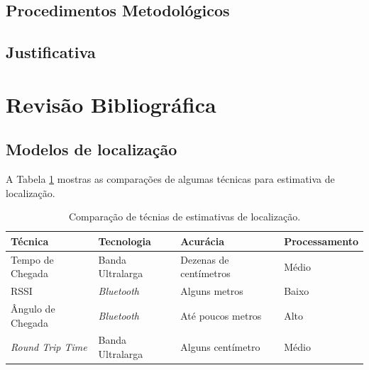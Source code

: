\documentclass[%
  10pt,%
  aspectratio = 43,%
  compress,%
  t,%
  english,%
  brazilian,%
]{beamer}
\begin{document}
\subsection{Procedimentos Metodológicos}\label{ssec:procedimento}
\begin{frame}
\end{frame}

\subsection{Justificativa}\label{ssec:justificativa}
\begin{frame}
\end{frame}



\section{Revisão Bibliográfica}\label{sec:revisao}
\subsection{Modelos de localização}\label{ssec:modelos}

\begin{frame}
A Tabela \ref{tab:resumo_tecnicas} mostras as comparações de algumas técnicas para estimativa de localização.

    \begin{table}[!htb]
    	\centering
    	\caption{Comparação de técnias de estimativas de localização.}
    	\label{tab:resumo_tecnicas}
    	\begin{tabular*}{\columnwidth}{@{\extracolsep{\fill}}|llll|}
    		\hline
    		Técnica & Tecnologia & Acurácia & Processamento \\
            \hline
    		\hline
    		  Tempo de Chegada  & Banda Ultralarga & Dezenas de centímetros & Médio \\
            RSSI  & \textit{Bluetooth} & Alguns metros & Baixo \\
            Ângulo de Chegada   & \textit{Bluetooth} & Até poucos metros & Alto \\
            \textit{Round Trip Time}  & Banda Ultralarga & Alguns centímetro & Médio \\
    		\hline
    	\end{tabular*}
    \end{table}
\end{frame}
\end{document}
